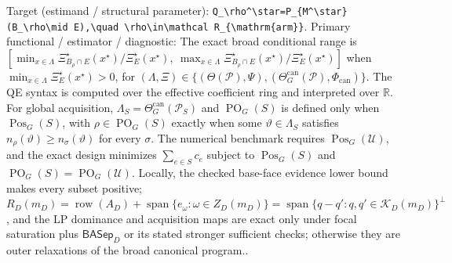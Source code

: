 \documentclass{article}
\begin{document}
Target (estimand / structural parameter): \texttt{Q\_\allowbreak{}\textbackslash{}\allowbreak{}rho\textasciicircum{}\textbackslash{}\allowbreak{}star=\allowbreak{}P\_\allowbreak{}\{M\textasciicircum{}\textbackslash{}\allowbreak{}star\}\allowbreak{}(B\_\allowbreak{}\textbackslash{}\allowbreak{}rho\textbackslash{}\allowbreak{}mid E),\allowbreak{}\textbackslash{}\allowbreak{}quad \textbackslash{}\allowbreak{}rho\textbackslash{}\allowbreak{}in\textbackslash{}\allowbreak{}mathcal R\_\allowbreak{}\{\textbackslash{}\allowbreak{}mathrm\{arm\}\allowbreak{}\}\allowbreak{}}.
Primary functional / estimator / diagnostic: The exact broad conditional range is \(\left[\min_{x\in\Lambda}\Xi_{B_\rho\cap E}^\star(x^\star)/\Xi_E^\star(x^\star),\ \max_{x\in\Lambda}\Xi_{B_\rho\cap E}^\star(x^\star)/\Xi_E^\star(x^\star)\right]\) when \(\min_{x\in\Lambda}\Xi_E^\star(x^\star)>0\), for \((\Lambda,\Xi)\in\{(\Theta(\mathcal P),\Psi),(\Theta_G^{\mathrm{can}}(\mathcal P),\Phi_{\mathrm{can}})\}\).  The QE syntax is computed over the effective coefficient ring and interpreted over \(\mathbb R\).  For global acquisition, \(\Lambda_S=\Theta_G^{\mathrm{can}}(\mathcal P_S)\) and \(\operatorname{PO}_G(S)\) is defined only when \(\operatorname{Pos}_G(S)\), with \(\rho\in\operatorname{PO}_G(S)\) exactly when some \(\vartheta\in\Lambda_S\) satisfies \(n_\rho(\vartheta)\geq n_\sigma(\vartheta)\) for every \(\sigma\).  The numerical benchmark requires \(\operatorname{Pos}_G(\mathcal U)\), and the exact design minimizes \(\sum_{e\in S}c_e\) subject to \(\operatorname{Pos}_G(S)\) and \(\operatorname{PO}_G(S)=\operatorname{PO}_G(\mathcal U)\).  Locally, the checked base-face evidence lower bound makes every subset positive; \(R_D(m_D)=\operatorname{row}(A_D)+\operatorname{span}\{e_\omega:\omega\in Z_D(m_D)\}=\operatorname{span}\{q-q':q,q'\in\mathcal K_D(m_D)\}^{\perp}\), and the LP dominance and acquisition maps are exact only under focal saturation plus \(\mathsf{BASep}_D\) or its stated stronger sufficient checks; otherwise they are outer relaxations of the broad canonical program..
\end{document}
